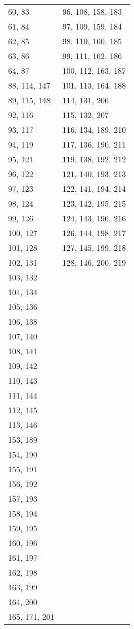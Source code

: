 \begin{center}
\begin{longtabu}[c]{|X|X|}
    60, 83&96, 108, 158, 183\\
    61, 84&97, 109, 159, 184\\
    62, 85&98, 110, 160, 185\\
    63, 86&99, 111, 162, 186\\
    64, 87&100, 112, 163, 187\\
    88, 114, 147&101, 113, 164, 188\\
    89, 115, 148&114, 131, 206\\
    92, 116&115, 132, 207\\
    93, 117&116, 134, 189, 210\\
    94, 119&117, 136, 190, 211\\
    95, 121&119, 138, 192, 212\\
    96, 122&121, 140, 193, 213\\
    97, 123&122, 141, 194, 214\\
    98, 124&123, 142, 195, 215\\
    99, 126&124, 143, 196, 216\\
    100, 127&126, 144, 198, 217\\
    101, 128&127, 145, 199, 218\\
    102, 131&128, 146, 200, 219\\
    103, 132&\\
    104, 134&\\
    105, 136&\\
    106, 138&\\
    107, 140&\\
    108, 141&\\
    109, 142&\\
    110, 143&\\
    111, 144&\\
    112, 145&\\
    113, 146&\\
    153, 189&\\
    154, 190&\\
    155, 191&\\
    156, 192&\\
    157, 193&\\
    158, 194&\\
    159, 195&\\
    160, 196&\\
    161, 197&\\
    162, 198&\\
    163, 199&\\
    164, 200&\\
    165, 171, 201&\\

\end{longtabu}
\end{center}
